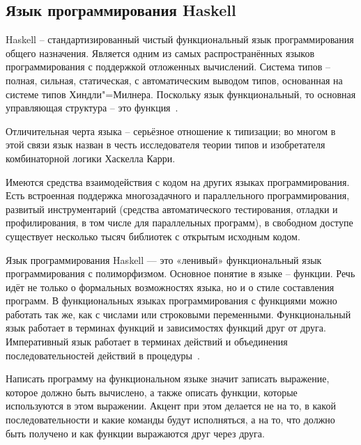 \subsection{Язык программирования Haskell}
\label{sub:techs:haskell}
Haskell -- стандартизированный чистый функциональный язык программирования общего назначения. Является одним из самых распространённых языков программирования с поддержкой отложенных вычислений. Система типов -- полная, сильная, статическая, с автоматическим выводом типов, основанная на системе типов Хиндли"=Милнера. Поскольку язык функциональный, то основная управляющая структура -- это функция~\cite{haskell_good}.

Отличительная черта языка -- серьёзное отношение к типизации; во многом в этой связи язык назван в честь исследователя теории типов и изобретателя комбинаторной логики Хаскелла Карри.

Имеются средства взаимодействия с кодом на других языках программирования. Есть встроенная поддержка многозадачного и параллельного программирования, развитый инструментарий (средства автоматического тестирования, отладки и профилирования, в том числе для параллельных программ), в свободном доступе существует несколько тысяч библиотек с открытым исходным кодом.

Язык программирования Haskell — это «ленивый» функциональный язык программирования с полиморфизмом. Основное понятие в языке -- функции. Речь идёт не только о формальных возможностях языка, но и о стиле составления программ. В функциональных языках программирования с функциями можно работать так же, как с числами или строковыми переменными. Функциональный язык работает в терминах функций и зависимостях функций друг от друга. Императивный язык работает в терминах действий и объединения последовательностей действий в процедуры~\cite{wiki_haskell}.

Написать программу на функциональном языке значит записать выражение, которое должно быть вычислено, а также описать функции, которые используются в этом выражении. Акцент при этом делается не на то, в какой последовательности и какие команды будут исполняться, а на то, что должно быть получено и как функции выражаются друг через друга.

